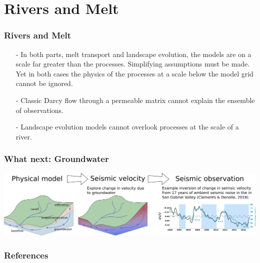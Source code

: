 \documentclass[aspectratio=169]{beamer}
\begin{document}
\section{Rivers and Melt}

\begin{frame}
    \frametitle{Rivers and Melt}
    \begin{itemize}
        \item[-]{In both parts, melt transport and landscape evolution, the models are on a scale far greater than the processes.
                 Simplifying assumptions must be made. Yet in both cases the physics of the processes at a scale below the model grid cannot be ignored.}
        \item[-]{Classic Darcy flow through a permeable matrix cannot explain the ensemble of observations.}
        \item[-]{Landscape evolution models cannot overlook processes at the scale of a river.}
    \end{itemize}
\end{frame}

\begin{frame}
    \frametitle{What next: Groundwater}
    \includegraphics[width=0.9\paperwidth]{./figures/groundwater.svg.png}
\end{frame}

\begin{frame}
    \frametitle{References}
    {\tiny
    
    
    }
\end{frame}
\end{document}
